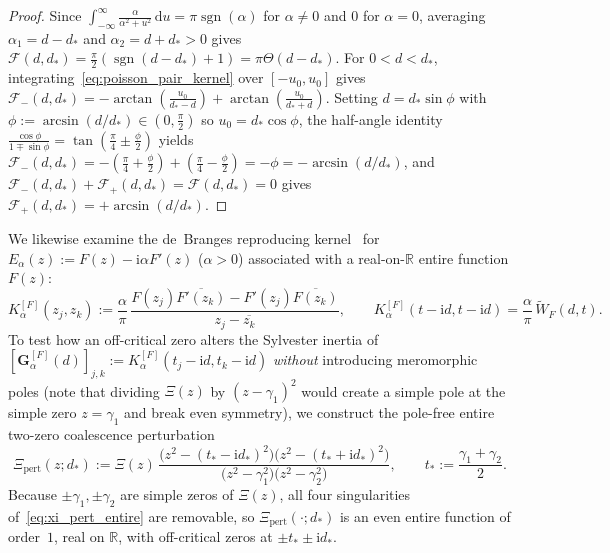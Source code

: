 \documentclass[11pt,reqno]{amsart}
\theoremstyle{plain}
\theoremstyle{definition}
\theoremstyle{remark}
\numberwithin{equation}{section}
\newcommand{\dd}{\,\mathrm{d}}
\newcommand{\ii}{\mathrm{i}}
\DeclareMathOperator{\sgn}{sgn}
\begin{document}
\begin{proof}
Since $\int_{-\infty}^{\infty} \frac{\alpha}{\alpha^2 + u^2}\dd u = \pi\sgn(\alpha)$ for $\alpha \neq 0$ and $0$ for $\alpha = 0$, averaging $\alpha_1 = d - d_*$ and $\alpha_2 = d + d_* > 0$ gives $\mathcal{F}(d, d_*) = \frac{\pi}{2}(\sgn(d - d_*) + 1) = \pi\Theta(d - d_*)$. For $0 < d < d_*$, integrating~\eqref{eq:poisson_pair_kernel} over $[-u_0, u_0]$ gives $\mathcal{F}_-(d, d_*) = -\arctan(\frac{u_0}{d_* - d}) + \arctan(\frac{u_0}{d_* + d})$. Setting $d = d_*\sin\phi$ with $\phi := \arcsin(d/d_*) \in (0, \frac{\pi}{2})$ so $u_0 = d_*\cos\phi$, the half-angle identity $\frac{\cos\phi}{1 \mp \sin\phi} = \tan(\frac{\pi}{4} \pm \frac{\phi}{2})$ yields $\mathcal{F}_-(d, d_*) = -(\frac{\pi}{4} + \frac{\phi}{2}) + (\frac{\pi}{4} - \frac{\phi}{2}) = -\phi = -\arcsin(d/d_*)$, and $\mathcal{F}_-(d, d_*) + \mathcal{F}_+(d, d_*) = \mathcal{F}(d, d_*) = 0$ gives $\mathcal{F}_+(d, d_*) = +\arcsin(d/d_*)$.
\end{proof}

We likewise examine the de~Branges reproducing kernel~\cite{debranges1968} for $E_\alpha(z) := F(z) - \ii\alpha F'(z)$ ($\alpha > 0$) associated with a real-on-$\mathbb{R}$ entire function $F(z)$:
\begin{equation}\label{eq:debranges_kernel}
K_\alpha^{[F]}(z_j, z_k) := \frac{\alpha}{\pi}\,\frac{F(z_j)\overline{F'(z_k)} - F'(z_j)\overline{F(z_k)}}{z_j - \overline{z_k}}, \qquad K_\alpha^{[F]}(t - \ii d, t - \ii d) = \frac{\alpha}{\pi}\,\widetilde{W}_F(d,t).
\end{equation}
To test how an off-critical zero alters the Sylvester inertia of $[\mathbf{G}_\alpha^{[F]}(d)]_{j,k} := K_\alpha^{[F]}(t_j - \ii d, t_k - \ii d)$ \emph{without} introducing meromorphic poles (note that dividing $\Xi(z)$ by $(z - \gamma_1)^2$ would create a simple pole at the simple zero $z = \gamma_1$ and break even symmetry), we construct the pole-free entire two-zero coalescence perturbation
\begin{equation}\label{eq:xi_pert_entire}
\Xi_{\mathrm{pert}}(z; d_*) := \Xi(z)\,\frac{\bigl(z^2 - (t_* - \ii d_*)^2\bigr)\bigl(z^2 - (t_* + \ii d_*)^2\bigr)}{\bigl(z^2 - \gamma_1^2\bigr)\bigl(z^2 - \gamma_2^2\bigr)}, \qquad t_* := \frac{\gamma_1 + \gamma_2}{2}.
\end{equation}
Because $\pm\gamma_1, \pm\gamma_2$ are simple zeros of $\Xi(z)$, all four singularities of~\eqref{eq:xi_pert_entire} are removable, so $\Xi_{\mathrm{pert}}(\cdot; d_*)$ is an even entire function of order~$1$, real on $\mathbb{R}$, with off-critical zeros at $\pm t_* \pm \ii d_*$.
\end{document}
